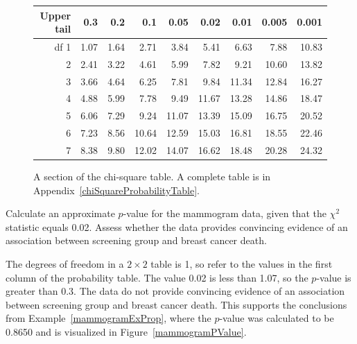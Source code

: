 \begin{figure}[h]
	\centering
	\begin{tabular}{r | rrrr | rrrr |}
		\hline
		Upper tail & 0.3 & 0.2 & 0.1 & 0.05 & 0.02 & 0.01 & 0.005 & 0.001 \\
		\hline
		df \hfill 1 & \footnotesize 1.07 & \footnotesize 1.64 & \footnotesize 2.71 & \footnotesize 3.84 & \footnotesize 5.41 & \footnotesize 6.63 & \footnotesize 7.88 & \footnotesize 10.83 \\
		\hfill 2 & \footnotesize 2.41 & \footnotesize 3.22 & \footnotesize 4.61 & \footnotesize 5.99 & \footnotesize 7.82 & \footnotesize 9.21 & \footnotesize 10.60 & \footnotesize 13.82 \\
		3 & \footnotesize 3.66 & \footnotesize 4.64 & \footnotesize 6.25 & \footnotesize 7.81 & \footnotesize 9.84 & \footnotesize 11.34 & \footnotesize 12.84 & \footnotesize 16.27 \\
		4 & \footnotesize 4.88 & \footnotesize 5.99 & \footnotesize 7.78 & \footnotesize 9.49 & \footnotesize 11.67 & \footnotesize 13.28 & \footnotesize 14.86 & \footnotesize 18.47 \\
		5 & \footnotesize 6.06 & \footnotesize 7.29 & \footnotesize 9.24 & \footnotesize 11.07 & \footnotesize 13.39 & \footnotesize 15.09 & \footnotesize 16.75 & \footnotesize 20.52 \\
		\hline
		6 & \footnotesize 7.23 & \footnotesize 8.56 & \footnotesize 10.64 & \footnotesize 12.59 & \footnotesize 15.03 & \footnotesize 16.81 & \footnotesize 18.55 & \footnotesize 22.46 \\
		7 & \footnotesize 8.38 & \footnotesize 9.80 & \footnotesize 12.02 & \footnotesize 14.07 & \footnotesize 16.62 & \footnotesize 18.48 & \footnotesize 20.28 & \footnotesize 24.32 \\
		\hline
	\end{tabular}
	\caption{A section of the chi-square table. A complete table is in Appendix~\vref{chiSquareProbabilityTable}.}
	\label{chiSquareProbabilityTableShort}
\end{figure}

\begin{examplewrap}
\begin{nexample}{Calculate an approximate $p$-value for the mammogram data, given that the $\chi^2$ statistic equals 0.02. Assess whether the data provides convincing evidence of an association between screening group and breast cancer death.}

The degrees of freedom in a $2 \times 2$ table is 1, so refer to the values in the first column of the probability table. The value 0.02 is less than 1.07, so the $p$-value is greater than 0.3. The data do not provide convincing evidence of an association between screening group and breast cancer death. This supports the conclusions from Example~\ref{mammogramExProp}, where the $p$-value was calculated to be 0.8650 and is visualized in Figure~\ref{mammogramPValue}.
\end{nexample}
\end{examplewrap}

